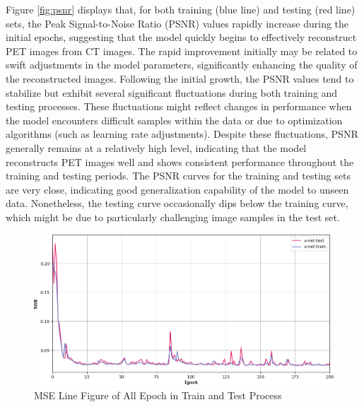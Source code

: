 \documentclass[twocolumn]{article}
\begin{document}
Figure \ref{fig:psnr} displays that, for both training (blue line) and testing (red line) sets, the Peak Signal-to-Noise Ratio (PSNR) values rapidly increase during the initial epochs, suggesting that the model quickly begins to effectively reconstruct PET images from CT images. The rapid improvement initially may be related to swift adjustments in the model parameters, significantly enhancing the quality of the reconstructed images. Following the initial growth, the PSNR values tend to stabilize but exhibit several significant fluctuations during both training and testing processes. These fluctuations might reflect changes in performance when the model encounters difficult samples within the data or due to optimization algorithms (such as learning rate adjustments). Despite these fluctuations, PSNR generally remains at a relatively high level, indicating that the model reconstructs PET images well and shows consistent performance throughout the training and testing periods. The PSNR curves for the training and testing sets are very close, indicating good generalization capability of the model to unseen data. Nonetheless, the testing curve occasionally dips below the training curve, which might be due to particularly challenging image samples in the test set.

\begin{figure}[h]
	\centering
	\includegraphics[width=1.0\linewidth]{u-net/MSE}
	\caption[mse]{MSE Line Figure of All Epoch in Train and Test Process}
	\label{fig:mse}
\end{figure}
\end{document}
